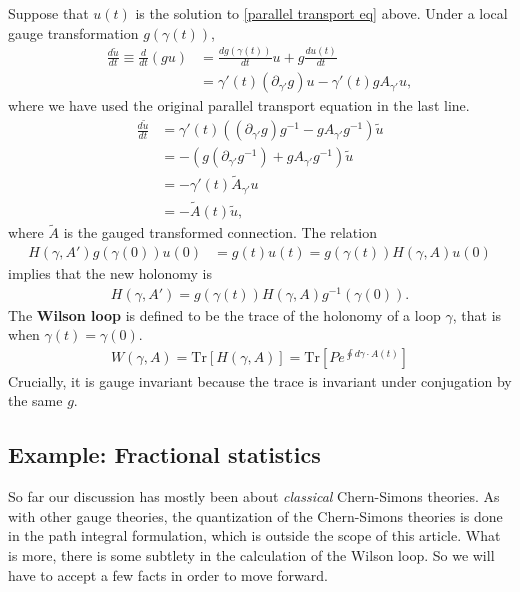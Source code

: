 \documentclass[aps,nofootinbib]{revtex4}
\newcommand\Tr{\mathrm{Tr}}
\begin{document}
Suppose that $u(t)$ is the solution to \eqref{parallel transport eq} above. Under a local gauge transformation $g(\gamma(t))$,
\begin{align*}
\frac{d\tilde{u}}{dt} \equiv \frac{d}{dt} (gu)  
	&= \frac{d g(\gamma(t))}{dt}u + g \frac{du(t)}{dt} \\
    &= \gamma'(t) (\partial_{\gamma'} g) u - \gamma'(t) g A_{\gamma'} u, 
\end{align*}
where we have used the original parallel transport equation in the last line.
\begin{align*}
\frac{d\tilde{u}}{dt} &= \gamma'(t) \left( (\partial_{\gamma'} g) g^{-1} - g A_{\gamma'} g^{-1} \right) \tilde{u} \\
	&= -\left( g (\partial_{\gamma'} g^{-1}) + g A_{\gamma'} g^{-1} \right) \tilde{u} \\
    &= -\gamma'(t) \tilde{A}_{\gamma'} u \\
    &= - \tilde{A}(t) \tilde{u},
\end{align*}
where $\tilde{A}$ is the gauged transformed connection. The relation
\begin{align*}
H(\gamma, A') g(\gamma(0)) u(0) &= g(t) u(t) = g(\gamma(t)) H(\gamma, A) u(0)
\end{align*}
implies that the new holonomy is
\begin{align}
\boxed{H(\gamma, A') = g(\gamma(t)) H(\gamma, A) g^{-1}(\gamma(0))}.
\end{align}
The {\bf Wilson loop} is defined to be the trace of the holonomy of a loop $\gamma$, that is when $\gamma(t)=\gamma(0)$.
\begin{align}
\boxed{W(\gamma,A) = \Tr [H(\gamma,A)] = \Tr \left[ Pe^{\oint d\gamma \cdot A(t)} \right]}
\end{align}
Crucially, it is gauge invariant because the trace is invariant under conjugation by the same $g$.

\subsection{Example: Fractional statistics}

So far our discussion has mostly been about \emph{classical} Chern-Simons theories. As with other gauge theories, the quantization of the Chern-Simons theories is done in the path integral formulation, which is outside the scope of this article. What is more, there is some subtlety in the calculation of the Wilson loop. So we will have to accept a few facts in order to move forward.
\end{document}
